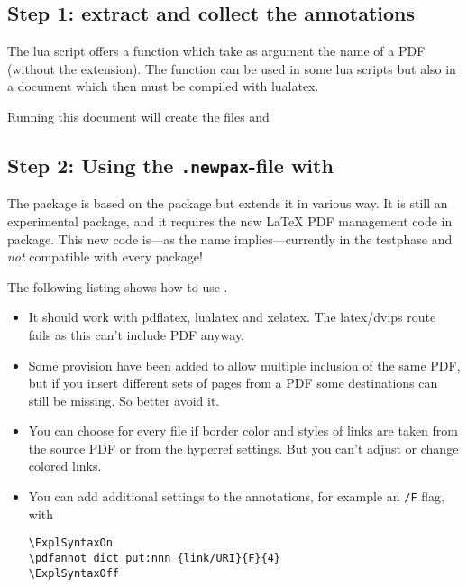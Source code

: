 \documentclass[DIV=12,parskip=half-,bibliography=totoc]{scrartcl}
\begin{document}
\subsection{Step 1: extract and collect the annotations}

The lua script offers a function which take as argument the name of a PDF (without the extension).
The function can be used in some lua scripts but also in a document which then must be compiled
with lualatex.



Running this document will create the files  and 


\subsection{Step 2: Using the \texttt{.newpax}-file with \texorpdfstring{}{newpax}}

The package  is based on the package  but extends it in various way.
It is still an experimental package, and it requires the new \LaTeX{} PDF management 
code in  package. This new code is---as the name implies---currently in the testphase and \emph{not} compatible with every package!

The following listing shows how to use .

\begin{itemize}
\item It should work with pdflatex, lualatex and xelatex. The latex/dvips route fails as this can't include PDF anyway.
\item Some provision have been added to allow multiple inclusion of the same PDF, but if you insert different sets of pages from a PDF some destinations can still be missing. So better avoid it.
\item You can choose for every file if border color and styles of links are taken from the source PDF or from the hyperref settings. But you can't adjust or change colored links.
\item You can add additional settings to the annotations, for example an \texttt{/F} flag, with

\begin{lstlisting}
\ExplSyntaxOn
\pdfannot_dict_put:nnn {link/URI}{F}{4}
\ExplSyntaxOff
\end{lstlisting}

\end{itemize}
\end{document}
